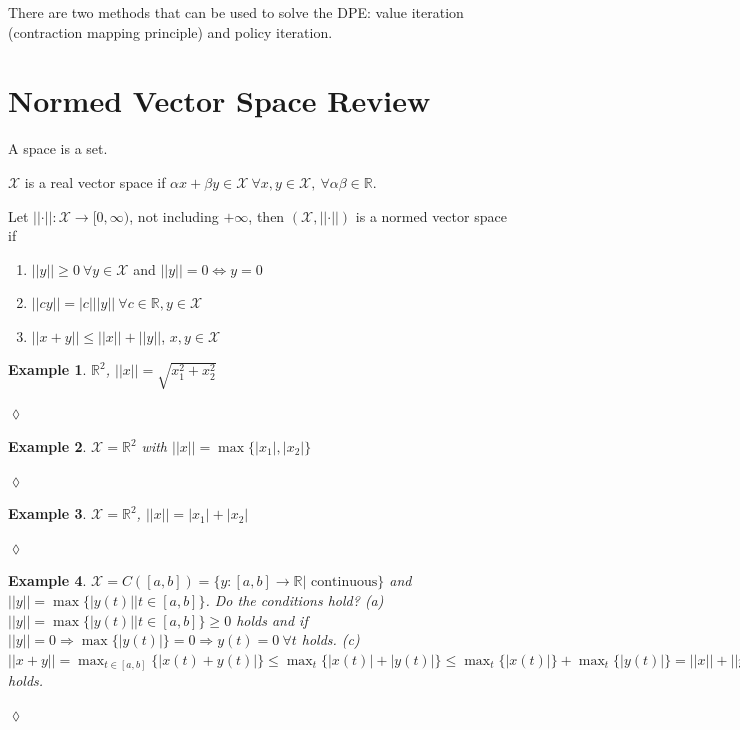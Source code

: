 \documentclass[lecture,12pt,]{pcms-l}
\theoremstyle{example}
\newtheorem{example}{Example}[section]
\newcommand{\vectornorm}[1]{\left|\left|#1\right|\right|}
\begin{document}
There are two methods that can be used to solve the DPE: value iteration (contraction mapping principle) and policy iteration.

\section{Normed Vector Space Review}
\begin{definition}
A space is a set.
\end{definition}

\begin{definition}
$\mathcal{X}$ is a real vector space if $\alpha x+\beta y\in\mathcal{X} ~\forall x,y\in\mathcal{X}, ~\forall \alpha\beta\in\mathbb{R}$.
\end{definition}

\begin{definition}
Let $\vectornorm{\cdot}: \mathcal{X}\to[0,\infty)$, not including $+\infty$, then $(\mathcal{X},\vectornorm{\cdot})$ is a normed vector space if
\begin{enumerate}
\item $\vectornorm{y}\geq0 ~\forall y\in\mathcal{X}$ and $\vectornorm{y}=0\Leftrightarrow y=0$
\item $||cy|| = |c|\vectornorm{y} ~\forall c\in\mathbb{R}, y\in\mathcal{X}$
\item $\vectornorm{x+y}\leq ||x|| + ||y||$, $x,y\in\mathcal{X}$
\end{enumerate}
\end{definition}

\begin{example}
$\mathbb{R}^2$, $||x||=\sqrt{x_1^2+x_2^2}$
\end{example}
$\lozenge$

\begin{example}
$\mathcal{X}=\mathbb{R}^2$ with $||x|| = \max\{|x_1|,|x_2|\}$
\end{example}
$\lozenge$

\begin{example}
$\mathcal{X} = \mathbb{R}^2$, $||x||=|x_1|+|x_2|$
\end{example}
$\lozenge$

\begin{example}
$\mathcal{X} = C([a,b]) = \{y:[a,b]\to\mathbb{R} | \text{ continuous}\}$ and $||y|| = \max\{|y(t)| | t\in[a,b]\}$. Do the conditions hold?
\newline
(a) $||y|| = \max\{|y(t)| | t\in[a,b]\}\geq 0$ holds and if $||y||=0 \Rightarrow \max\{|y(t)|\} = 0 \Rightarrow y(t)=0 ~\forall t$ holds.
\newline
(c) $||x+y|| = \max_{t\in[a,b]}\{|x(t)+y(t)|\} \leq \max_t\{|x(t)|+|y(t)|\} \leq \max_t\{|x(t)|\} + \max_t\{|y(t)|\} = ||x|| + ||y||$ holds.
\end{example}
$\lozenge$
\end{document}
